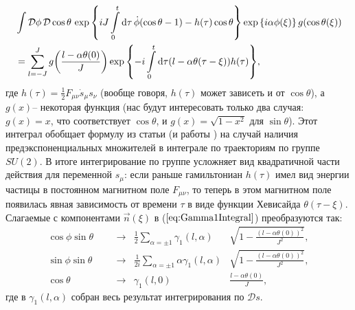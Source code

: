 \begin{equation*}
	\begin{split}
	&\int\mathcal{D}\phi\,\mathcal{D}\cos{\theta}\,\exp{\left\{ iJ\int\limits_0^t \mathrm{d}\tau\,\dot{\phi} (\cos{\theta} - 1) - h(\tau)\cos{\theta}\right\}} \exp{\left\{i \alpha \phi(\xi)\right\}} \, g(\cos{\theta(\xi)})\\
	&=\sum\limits_{l=-J}^J g\!\left( \frac{l-\alpha \theta(0)}{J} \right) \exp{\left\{-i\int\limits_0^t\mathrm{d}\tau (l-\alpha \theta(\tau - \xi))h(\tau)\right\}},
	\end{split}
\end{equation*}
где $h(\tau)=\frac 12 F_{\mu \nu}\dot{s}_\mu s_\nu$ (вообще говоря, $h(\tau)$ может зависеть и от $\cos{\theta}$), а $g(x)$-- некоторая функция (нас будут интересовать только два случая: $g(x)=x$, что соответствует $\cos{\theta}$, и $g(x)=\sqrt{1-x^2}$ для $\sin{\theta}$). Этот интеграл обобщает формулу из статьи \cite{Alekseev1988} (и работы \cite{Mnev}) на случай наличия предэкспоненциальных множителей в интеграле по траекториям по группе $SU(2)$. В итоге интегрирование по группе усложняет вид квадратичной части действия для переменной $s_\mu$: если раньше гамильтониан $h(\tau)$ имел вид энергии частицы в постоянном магнитном поле $F_{\mu \nu}$, то теперь в этом магнитном поле появилась явная зависимость от времени $\tau$ в виде функции Хевисайда $\theta(\tau-\xi)$. Слагаемые с компонентами $\vec{n}(\xi)$ в ($\ref{eq:Gamma1Integral}$) преобразуются так:
\begin{align*}
	\cos{\phi}\sin{\theta}& 	&	&\longrightarrow 	&	\frac12 \sum\limits_{\alpha=\pm1}\gamma_1(l,\alpha)&\sqrt{1-\frac{(l-\alpha \theta(0))^2}{J^2}},\\
	\sin{\phi}\sin{\theta}& 	&	&\longrightarrow 	&	\frac{1}{2i} \sum\limits_{\alpha=\pm1}\alpha\gamma_1(l,\alpha)&\sqrt{1-\frac{(l-\alpha \theta(0))^2}{J^2}},\\
	\cos{\theta}& 		&	&\longrightarrow 	&	\gamma_1(l,0)&\frac{l-\alpha \theta(0)}{J},
\end{align*}
где в $\gamma_1(l,\alpha)$ собран весь результат интегрирования по $\mathcal{D}s$.